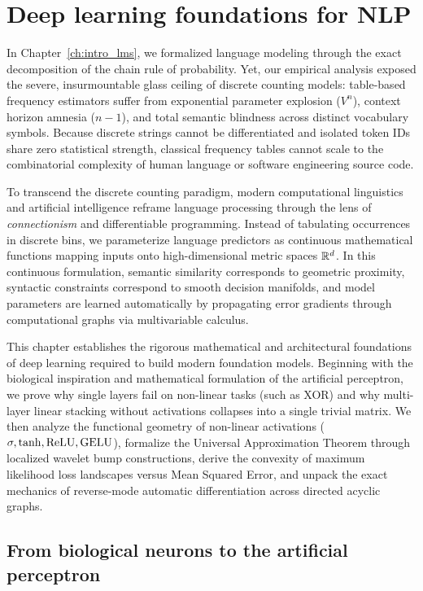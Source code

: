 \documentclass[../../main.tex]{subfiles}
\begin{document}
\chapter{Deep learning foundations for NLP}
\label{ch:deep_learning_foundations}

In Chapter~\ref{ch:intro_lms}, we formalized language modeling through the exact decomposition of the chain rule of probability. Yet, our empirical analysis exposed the severe, insurmountable glass ceiling of discrete counting models: table-based frequency estimators suffer from exponential parameter explosion ($V^n$), context horizon amnesia ($n-1$), and total semantic blindness across distinct vocabulary symbols. Because discrete strings cannot be differentiated and isolated token IDs share zero statistical strength, classical frequency tables cannot scale to the combinatorial complexity of human language or software engineering source code.

To transcend the discrete counting paradigm, modern computational linguistics and artificial intelligence reframe language processing through the lens of \emph{connectionism} and differentiable programming. Instead of tabulating occurrences in discrete bins, we parameterize language predictors as continuous mathematical functions mapping inputs onto high-dimensional metric spaces $\mathbb{R}^d$. In this continuous formulation, semantic similarity corresponds to geometric proximity, syntactic constraints correspond to smooth decision manifolds, and model parameters are learned automatically by propagating error gradients through computational graphs via multivariable calculus.

This chapter establishes the rigorous mathematical and architectural foundations of deep learning required to build modern foundation models. Beginning with the biological inspiration and mathematical formulation of the artificial perceptron, we prove why single layers fail on non-linear tasks (such as XOR) and why multi-layer linear stacking without activations collapses into a single trivial matrix. We then analyze the functional geometry of non-linear activations ($\sigma, \tanh, \operatorname{\mathrm{ReLU}}, \operatorname{\mathrm{GELU}}$), formalize the Universal Approximation Theorem through localized wavelet bump constructions, derive the convexity of maximum likelihood loss landscapes versus Mean Squared Error, and unpack the exact mechanics of reverse-mode automatic differentiation across directed acyclic graphs.

\clearpage
\section{From biological neurons to the artificial perceptron}
\label{sec:perceptron}
\end{document}
